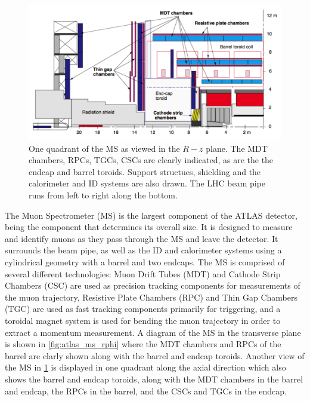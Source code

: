 \begin{figure}[ht]
\centering
\includegraphics[width=.8\textwidth]{figures/atlas/ms_rz}
\caption{One quadrant of the MS as viewed in the $R-z$ plane. The
MDT chambers, RPCs, TGCs, CSCs are clearly indicated, as are the 
the endcap and barrel toroids. Support structues, shielding and the calorimeter
and ID systems are also drawn. The LHC beam pipe runs from left to right
along the bottom.}
\label{fig:atlas_ms_rz}
\end{figure}

The Muon Spectrometer (MS) is the largest component of the ATLAS
detector, being the component that determines its overall size. 
It is designed to measure and identify muons as they
pass through the MS and leave the detector.
It surrounds the beam pipe, as well as the ID and calorimeter systems
using a cylindrical geometry with a barrel and two endcaps. 
The MS is comprised of several different technologies:
Muon Drift Tubes (MDT) and Cathode Strip Chambers (CSC) are used as
precision tracking components for measurements of the muon 
trajectory, Resistive Plate Chambers (RPC) and 
Thin Gap Chambers (TGC) are used as fast 
tracking components primarily for triggering, 
and a toroidal magnet system is used for bending the muon trajectory 
in order to extract a momentum measurement.
A diagram of the MS in the transverse plane is shown in 
\fig\ref{fig:atlas_ms_rphi} where the MDT chambers and RPCs of the barrel
are clarly shown along with the barrel and endcap toroids.
Another view of the MS in \fig\ref{fig:atlas_ms_rz} is displayed in
one quadrant along the axial direction which
also shows the barrel and endcap toroids, along with 
the MDT chambers in the barrel and endcap, the RPCs in the
barrel, and the CSCs and TGCs in the endcap.

